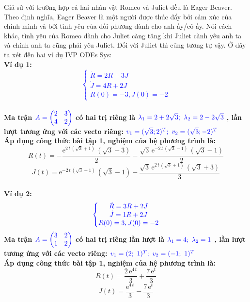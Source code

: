 
\begin{tcbdoublebox}[title={1. Eager Beaver and Eager Beaver}]
\mdseries Giả sử với trường hợp cả hai nhân vật Romeo và Juliet đều là Eager Beaver. Theo định nghĩa, Eager Beaver là một người được thúc đẩy bởi cảm xúc của chính mình và bởi tình yêu của đối phương dành cho anh ấy/cô ấy. Nói cách khác, tình yêu của Romeo dành cho Juliet càng tăng khi Juliet cành yêu anh ta và chính anh ta cũng phải yêu Juliet. Đối với Juliet thì cũng tương tự vậy. Ở đây ta xét đến hai ví dụ IVP ODEs Sys:\\
\bfseries Ví dụ 1: \\
\textcolor{blue}{$$\left\{\begin{matrix}
\dot{R} =  2R +3J \\ 
\dot{J} =  4R+2J\\ 
R(0)= -3, J(0)=-2
\end{matrix}\right.$$}\\
\mdseries Ma trận $\color{blue}A=\begin{pmatrix}
2 & 3\\ 
4 & 2
\end{pmatrix}$ có hai trị riêng là 
$\color{blue}\lambda_{1}=2+2\sqrt{3};\ \lambda_{2}=2-2\sqrt{3}$
, lần lượt tương ứng với các vecto riêng:
$\color{blue}v_{1} = (\sqrt{3}; 2)^{T};\ v_{2}=(\sqrt{3}; -2)^{T}$\\Áp dụng công thức bài tập 1, nghiệm của hệ phương trình là:
$$R(t)=-\frac{{\mathrm{e}}^{2\,t\,\left(\sqrt{3}+1\right)}\,\left(\sqrt{3}+3\right)}{2}-\frac{\sqrt{3}\,{\mathrm{e}}^{-2\,t\,\left(\sqrt{3}-1\right)}\,\left(\sqrt{3}-1\right)}{2} $$
$$J(t)={\mathrm{e}}^{-2\,t\,\left(\sqrt{3}-1\right)}\,\left(\sqrt{3}-1\right)-\frac{\sqrt{3}\,{\mathrm{e}}^{2\,t\,\left(\sqrt{3}+1\right)}\,\left(\sqrt{3}+3\right)}{3}$$
\\
\bfseries Ví dụ 2: \\
$$\color{blue}\left\{\begin{matrix}
\dot{R} =  3R + 2J \\ 
\dot{J} =  1R + 2J\\
R(0)= 3, J(0)=-2
\end{matrix}\right.$$
\mdseries Ma trận $\color{blue}A=\begin{pmatrix}
3 & 2\\ 
1 & 2
\end{pmatrix}$ có hai trị riêng lần lượt là $\color{blue}\lambda_{1}=4;\ \lambda_{2}=1$
, lần lượt tương ứng với các vecto riêng:
$\color{blue}v_{1} = (2;\ 1)^{T};\ v_{2}=(-1;\ 1)^{T}$
\\
Áp dụng công thức bài tập 1, nghiệm của hệ phương trình là:
$$R(t)=\frac{2\,{\mathrm{e}}^{4\,t}}{3}+\frac{7\,{\mathrm{e}}^t}{3} $$
$$J(t)=\frac{{\mathrm{e}}^{4\,t}}{3}-\frac{7\,{\mathrm{e}}^t}{3}$$


\end{tcbdoublebox}
